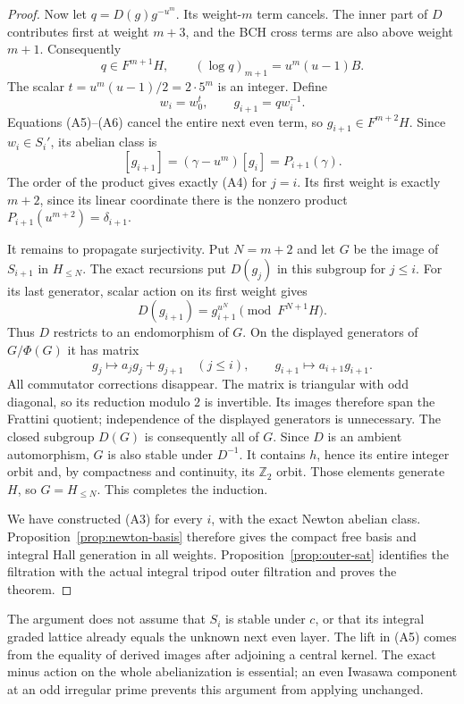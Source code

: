 \begin{proof}
Now let $q=D(g)g^{-u^m}$. Its weight-$m$ term cancels.
The inner part of $D$ contributes first at weight $m+3$,
and the BCH cross terms are also above weight $m+1$.
Consequently
\[
 q\in F^{m+1}H,\qquad
           (\log q)_{m+1}=u^m(u-1)B.               \tag{A6}
\]
The scalar $t=u^m(u-1)/2=2\cdot5^m$ is an integer.
Define
\[
 w_i=w_0^t,\qquad g_{i+1}=q w_i^{-1}.
\]
Equations (A5)--(A6) cancel the entire next even term,
so $g_{i+1}\in F^{m+2}H$. Since $w_i\in S_i'$, its
abelian class is
\[
 [g_{i+1}]=(\gamma-u^m)[g_i]=P_{i+1}(\gamma).
\]
The order of the product gives exactly (A4) for $j=i$.
Its first weight is exactly $m+2$, since its linear
coordinate there is the nonzero product
$P_{i+1}(u^{m+2})=\delta_{i+1}$.

It remains to propagate surjectivity. Put $N=m+2$ and
let $G$ be the image of $S_{i+1}$ in $H_{\leq N}$.
The exact recursions put $D(g_j)$ in this subgroup for
$j\leq i$. For its last generator, scalar action on
its first weight gives
\[
 D(g_{i+1})=g_{i+1}^{u^N}\pmod{F^{N+1}H}.
\]
Thus $D$ restricts to an endomorphism of $G$.
On the displayed generators of $G/\Phi(G)$ it has matrix
\[
 g_j\longmapsto a_jg_j+g_{j+1}\quad(j\leq i),
 \qquad g_{i+1}\longmapsto a_{i+1}g_{i+1}.
\]
All commutator corrections disappear. The matrix is
triangular with odd diagonal, so its reduction modulo
$2$ is invertible. Its images therefore span the Frattini
quotient; independence of the displayed generators is
unnecessary. The closed subgroup $D(G)$ is consequently
all of $G$. Since $D$ is an ambient automorphism, $G$ is
also stable under $D^{-1}$. It contains $h$, hence its
entire integer orbit and, by compactness and continuity,
its $\mathbb Z_2$ orbit. Those elements generate $H$,
so $G=H_{\leq N}$. This completes the induction.

We have constructed (A3) for every $i$, with the exact
Newton abelian class. Proposition~\ref{prop:newton-basis}
therefore gives the compact free basis and integral Hall
generation in all weights. Proposition~\ref{prop:outer-sat}
identifies the filtration with the actual integral tripod
outer filtration and proves the theorem.
\end{proof}

The argument does not assume that $S_i$ is stable under
$c$, or that its integral graded lattice already equals
the unknown next even layer. The lift in (A5) comes from
the equality of derived images after adjoining a central
kernel. The exact minus action on the whole abelianization
is essential; an even Iwasawa component at an odd irregular
prime prevents this argument from applying unchanged.
